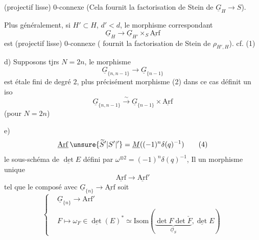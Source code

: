 (projectif lisse) $0$-connexe (Cela fournit la factorisation de Stein de $\underline{G}_H\longrightarrow S$).

Plus généralement, si $H'\subset H$, $d'<d$, le morphisme  correspondant
\[
\underline{G}_H\longrightarrow\underline{G}_{H'}\times_S\underline{\mathrm{Arf}}\tag*{(2)}
\]
est (projectif lisse) $0$-connexe ( fournit la factorisation de Stein de $\rho_{H',H}$). cf. (1)

d)  Supposons tjrs $N=2n$, le morphisme
\[
\underline{G}_{\{n,n-1\}}\longrightarrow\underline{G}_{\{n-1\}}\tag*{(3)}
\]
est étale fini de degré $2$, plus précisément  morphisme (2) dans ce cas définit un iso
\[
\underline{G}_{\{n,n-1\}}\xrightarrow{\sim}\underline{G}_{\{n-1\}}\times\underline{\mathrm{Arf}}
\]
(pour $N=2n$)

e)  %
\[
\underline{\mathrm{Arf}}\,\unsure{\widetilde S'|S'|{}'}=\underline{M}((-1)^n\delta(q)^{-1})\tag*{(4)}
\]
 le sous-schéma de $\underline{\det} E$ défini par $\omega^{\otimes 2}=(-1)^n\delta(q)^{-1}$, Il   un morphisme unique
\[
\underline{\mathrm{Arf}}\longrightarrow\underline{\mathrm{Arf}}'\tag*{(5)}
\]
tel que le composé avec $\underline{G}_{\{n\}}\longrightarrow\underline{\mathrm{Arf}}$ soit
\[
\left\{\begin{aligned}
&\underline{G}_{\{n\}}\longrightarrow\mathrm{Arf}'\\
&F\longmapsto\omega_F\in\underline{\det}(E)^*\simeq\mathrm{Isom}(\underbrace{\det F\det\check F}_{\underline{\mathcal O}_S},\underline{\det} E)
\end{aligned}\right.\tag*{(6)}
\]
